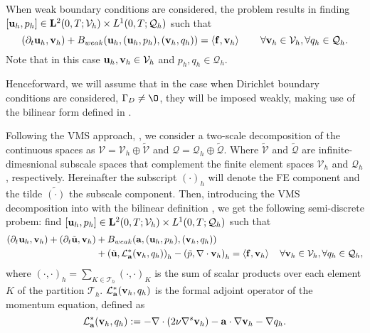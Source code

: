 When weak boundary conditions are considered, the problem results in finding $[{\bf u}_h,p_h]\in\mathbf{L}^2(0,T;\mathcal{V}_{h})\times L^1(0,T;\mathcal{Q}_{h})$ such that
\begin{equation}
\label{eq-C7_NS_galerkin_weak}
(\partial_t{\bf u}_h,{\bf v}_h)+B_{weak}({\bf u}_h,({\bf u}_h,p_h),({\bf v}_h,q_h)) =\left<{\bf f},{\bf v}_h\right>
\quad\quad\forall{\bf v}_h\in\mathcal{V}_{h},\forall q_h\in\mathcal{Q}_{h}.
\end{equation}
Note that in this case $ {\bf u}_h,{\bf v}_h\in\mathcal{V}_h $ and $ p_h,q_h\in\mathcal{Q}_h $.

Henceforward, we will assume that in the case when Dirichlet boundary conditions are considered, $ \Gamma_D\neq\O $, they will be imposed weakly, making use of the bilinear form defined in .

Following the VMS approach, \cite{hughes_variational_1998}, we consider a two-scale decomposition of the continuous spaces as $ \mathcal{V}=\mathcal{V}_h\oplus\widetilde{\mathcal{V}} $ and $ \mathcal{Q}=\mathcal{Q}_h\oplus\widetilde{\mathcal{Q}} $. Where $ \widetilde{\mathcal{V}} $ and $\widetilde{\mathcal{Q}} $ are infinite-dimesnional subscale spaces that complement the finite element spaces $ \mathcal{V}_h $ and $ \mathcal{Q}_h $, respectively. Hereinafter the subscript $(\cdot)_h$ will denote the FE component and the tilde $\widetilde{(\cdot)}$ the subscale component. Then, introducing the VMS decomposition into  with the bilinear definition , we get the following semi-discrete probem: find 
$[{\bf u}_h,p_h]\in\mathbf{L}^2(0,T;\mathcal{V}_{h})\times L^1(0,T;\mathcal{Q}_{h})$ such that
\begin{align}
\label{eq-C7_NS_vms_weak}
(\partial_t{\bf u}_h,{\bf v}_h)+(\partial_t\tilde{{\bf u}},{\bf v}_h)&+B_{weak}({\bf a},({\bf u}_h,p_h),({\bf v}_h,q_h))\\\nonumber
&+\left(\tilde{{\bf u}},\mathcal{L}^*_{\bf a}({\bf v}_h,q_h)\right)_h-\left(\tilde{p},\nabla\cdot{\bf v}_h\right)_h =\left<{\bf f},{\bf v}_h\right>
\quad\forall{\bf v}_h\in\mathcal{V}_{h},\forall q_h\in\mathcal{Q}_{h},
\end{align}
where $(\cdot,\cdot)_h=\sum_{K\in\mathcal{T}_h}(\cdot,\cdot)_K$ is the sum of scalar products  over each element $K$ of the partition $\mathcal{T}_h$. $ \mathcal{L}^*_{\bf a}({\bf v}_h,q_h) $ is the formal adjoint operator of the momentum equation, defined as 
\begin{equation}
\label{eq-C7_NS_adjoint}
\mathcal{L}^*_{\bf a}({\bf v}_h,q_h):=-\nabla\cdot\left(2\nu\nabla^s{\bf v}_h\right)-{\bf a}\cdot\nabla{\bf v}_h-\nabla q_h.
\end{equation}
